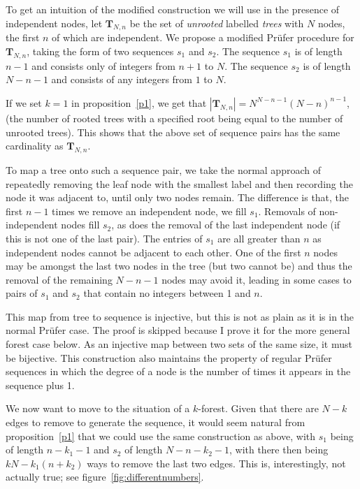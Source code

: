 \documentclass{article}
\newcommand{\prufer}{Pr{\"u}fer }
\begin{document}
To get an intuition of the modified construction we will use in the presence of independent nodes, let $\mathbf{T}_{N,n}$ be the set of \emph{unrooted} labelled \emph{trees} with $N$ nodes, the first $n$ of which are independent. We propose a modified \prufer procedure for $\mathbf{T}_{N,n}$, taking the form of two sequences $s_1$ and $s_2$. The sequence $s_1$ is of length $n-1$ and consists only of integers from $n+1$ to $N$. The sequence $s_2$ is of length $N-n-1$ and consists of any integers from $1$ to $N$. 

If we set $k=1$ in proposition~\ref{p1}, we get that $|\mathbf{T}_{N,n}| = N^{N-n-1}(N-n)^{n-1}$, (the number of rooted trees with a specified root being equal to the number of unrooted trees). This shows that the above set of sequence pairs has the same cardinality as $\mathbf{T}_{N,n}$.

To map a tree onto such a sequence pair, we take the normal approach \cite{Moon1970-li} of repeatedly removing the leaf node with the smallest label and then recording the node it was adjacent to, until only two nodes remain. The difference is that, the first $n-1$ times we remove an independent node, we fill $s_1$. Removals of non-independent nodes fill $s_2$, as does the removal of the last independent node (if this is not one of the last pair). The entries of $s_1$ are all greater than $n$ as independent nodes cannot be adjacent to each other. One of the first $n$ nodes may be amongst the last two nodes in the tree (but two cannot be) and thus the removal of the remaining $N-n-1$ nodes may avoid it, leading in some cases to pairs of $s_1$ and $s_2$ that contain no integers between 1 and $n$.

This map from tree to sequence is injective, but this is not as plain as it is in the normal \prufer case. The proof is skipped because I prove it for the more general forest case below. As an injective map between two sets of the same size, it must be bijective. This construction also maintains the property of regular \prufer sequences in which the degree of a node is the number of times it appears in the sequence plus 1.

We now want to move to the situation of a $k$-forest. Given that there are $N-k$ edges to remove to generate the sequence, it would seem natural from proposition~\ref{p1} that we could use the same construction as above, with $s_1$ being of length $n-k_1-1$ and $s_2$ of length $N-n-k_2-1$, with there then being $kN - k_1(n+k_2)$ ways to remove the last two edges. This is, interestingly, not actually true; see figure~\ref{fig:differentnumbers}.
\end{document}
